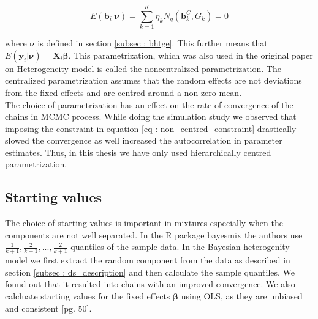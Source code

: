 \begin{equation}
\label{eq : non_centred_constraint}
E(\boldsymbol{b}_i | \boldsymbol{\nu}) = \sum_{k=1}^{K} \eta_k N_q(\boldsymbol{b}_k^C, G_k) = 0
\end{equation}

where $\boldsymbol{\nu}$ is defined in section \ref{subsec : bhtge}. This further means that $E(\boldsymbol{y}_i | \boldsymbol{\nu}) = \boldsymbol{X}_{i}\boldsymbol{\beta}$. This parametrization, which was also used in the original paper on Heterogeneity model \citep{verbeke_linear_1996} is called the noncentralized parametrization. The centralized parametrization assumes that the random effects are not deviations from the fixed effects and are centred around a non zero mean.\\

The choice of parametrization has an effect on the rate of convergence of the chains in MCMC process. While doing the simulation study we observed that imposing the constraint in equation \ref{eq : non_centred_constraint} drastically slowed the convergence as well increased the autocorrelation in parameter estimates. Thus, in this thesis we have only used hierarchically centred parametrization.

\subsection{Starting values}
\label{subsec : choice_starting_values}
The choice of starting values is important in mixtures especially when the components are not well separated. In the R package bayesmix \citep{gruen_bayesmix:_2015} the authors use $\frac 1 {k+1}, \frac 2 {k+1}, ..., \frac 2 {k+1}$ quantiles of the sample data. In the Bayesian heterogenity model we first extract the random component from the data as described in section \ref{subsec : ds_description} and then calculate the sample quantiles. We found out that it resulted into chains with an improved convergence. We also calcluate starting values for the fixed effects $\boldsymbol{\beta}$ using OLS, as they are unbiased and consistent [pg. 50]\citep{verbeke_linear_2009}.

